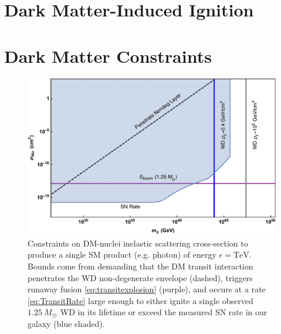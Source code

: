 \documentclass[twocolumn, preprintnumbers,amsmath,amssymb,prd, superscriptaddress]{revtex4}
\begin{document}
\section{Dark Matter-Induced Ignition}
\label{sec:dmignition}


\section{Dark Matter Constraints}
\label{sec:constraints}


\begin{figure}
\includegraphics[scale=.35]{transitobservation.pdf}
\caption{Constraints on DM-nuclei inelastic scattering cross-section to produce a single SM product (e.g. photon) of energy $\epsilon = \text{TeV}$. 
Bounds come from demanding that the DM transit interaction penetrates the WD non-degenerate envelope (dashed), triggers runaway fusion \eqref{eq:transitexplosion} (purple), and occurs at a rate \eqref{eq:TransitRate} large enough to either ignite a single observed $1.25~M_{\astrosun}$ WD in its lifetime or exceed the measured SN rate in our galaxy (blue shaded).
}
\label{fig:transit-inelastic}
\end{figure}
\end{document}
